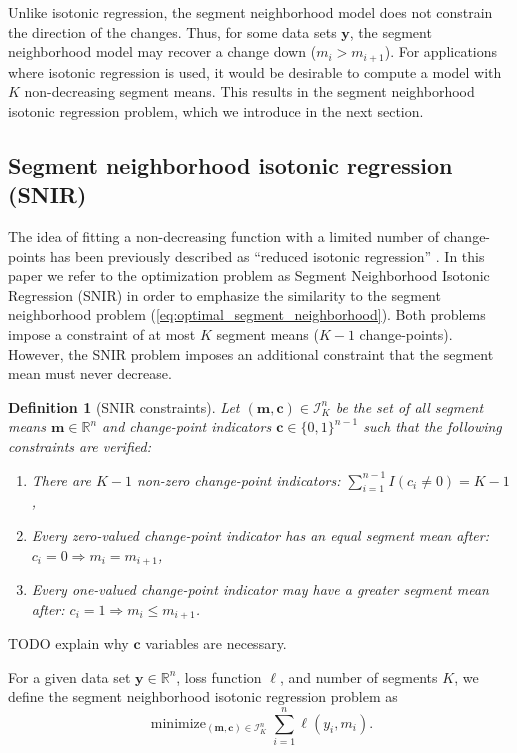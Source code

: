 \documentclass{article}
\newtheorem{definition}{Definition}
\DeclareMathOperator*{\minimize}{minimize}
\newcommand{\RR}{\mathbb R}
\begin{document}
Unlike isotonic regression, the segment neighborhood model
does not constrain the direction of the changes. Thus, for some
data sets $\mathbf y$, the segment neighborhood model may
recover a change down ($m_i > m_{i+1}$). For applications where
isotonic regression is used, it would be desirable to compute a model
with $K$ non-decreasing segment means. This results in the segment neighborhood
isotonic regression problem, which we introduce in the next section.

\subsection{Segment neighborhood isotonic regression (SNIR)}

The idea of fitting a non-decreasing function with a limited number of
change-points has been previously described as ``reduced isotonic
regression'' \citep{reduced-monotonic-regression,
  hardwick2014optimal}. In this paper we refer to the optimization
problem as Segment Neighborhood Isotonic Regression (SNIR) in order to
emphasize the similarity to the segment neighborhood problem
(\ref{eq:optimal_segment_neighborhood}). Both problems impose a
constraint of at most $K$ segment means ($K-1$
change-points). However, the SNIR problem imposes an additional
constraint that the segment mean must never decrease.

\begin{definition}[SNIR constraints]
  \label{def:I}
  Let $(\mathbf m, \mathbf c)\in\mathcal I_K^n$ be the set of all segment means
  $\mathbf m\in\RR^n$ and change-point indicators
  $\mathbf c\in\{0,1\}^{n-1}$ such that the following constraints are
  verified:
  \begin{enumerate}
  \item There are $K-1$ non-zero change-point indicators:
    $\sum_{i=1}^{n-1} I(c_i \neq 0) = K-1$,
  \item Every zero-valued change-point indicator has an equal segment mean
  after: $c_i = 0 \Rightarrow m_i = m_{i+1}$, 
  \item Every one-valued
    change-point indicator may have a greater segment mean after:
    $c_i = 1 \Rightarrow m_i \leq m_{i+1}$.
  \end{enumerate}
\end{definition}

TODO explain why $\mathbf c$ variables are necessary.

For a given data set $\mathbf y\in\RR^n$, loss function $\ell$, and
number of segments $K$, we define the segment neighborhood isotonic regression
problem as
\begin{equation}
  \label{eq:SNIR}
  \minimize_{(\mathbf m, \mathbf c)\in\mathcal I_K^n} \sum_{i=1}^n \ell(y_i, m_i).
\end{equation}
\end{document}
